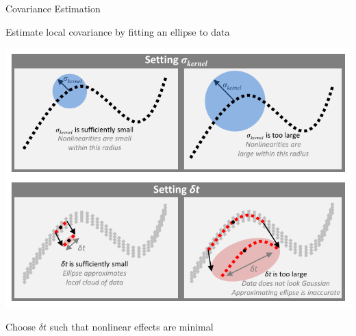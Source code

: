 \documentclass[12pt]{beamer}
\begin{document}
\begin{frame}{Covariance Estimation}

\centering


Estimate local covariance by fitting an ellipse to data

\vspace{0.5cm}

\includegraphics[width=\textwidth, trim=0cm 0cm 0cm 5cm, clip]{schematic}

\vspace{0.5cm}

Choose $\delta t$ such that nonlinear effects are minimal

\end{frame}
\end{document}
